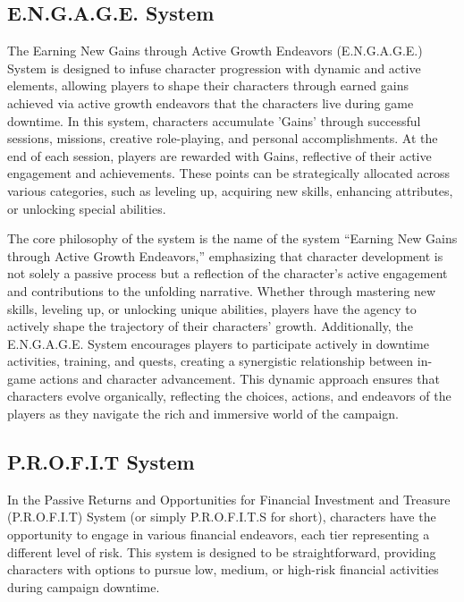 \subsection{E.N.G.A.G.E. System}

The Earning New Gains through Active Growth Endeavors (E.N.G.A.G.E.) System is designed to infuse character progression with dynamic and active elements, allowing players to shape their characters through earned gains achieved via active growth endeavors that the characters live during game downtime. In this system, characters accumulate 'Gains' through successful sessions, missions, creative role-playing, and personal accomplishments. At the end of each session, players are rewarded with Gains, reflective of their active engagement and achievements. These points can be strategically allocated across various categories, such as leveling up, acquiring new skills, enhancing attributes, or unlocking special abilities.

The core philosophy of the system is the name of the system ``Earning New Gains through Active Growth Endeavors,'' emphasizing that character development is not solely a passive process but a reflection of the character's active engagement and contributions to the unfolding narrative. Whether through mastering new skills, leveling up, or unlocking unique abilities, players have the agency to actively shape the trajectory of their characters' growth. Additionally, the E.N.G.A.G.E. System encourages players to participate actively in downtime activities, training, and quests, creating a synergistic relationship between in-game actions and character advancement. This dynamic approach ensures that characters evolve organically, reflecting the choices, actions, and endeavors of the players as they navigate the rich and immersive world of the campaign.

\subsection{P.R.O.F.I.T System}

In the Passive Returns and Opportunities for Financial Investment and Treasure (P.R.O.F.I.T) System (or simply P.R.O.F.I.T.S for short), characters have the opportunity to engage in various financial endeavors, each tier representing a different level of risk. This system is designed to be straightforward, providing characters with options to pursue low, medium, or high-risk financial activities during campaign downtime.

